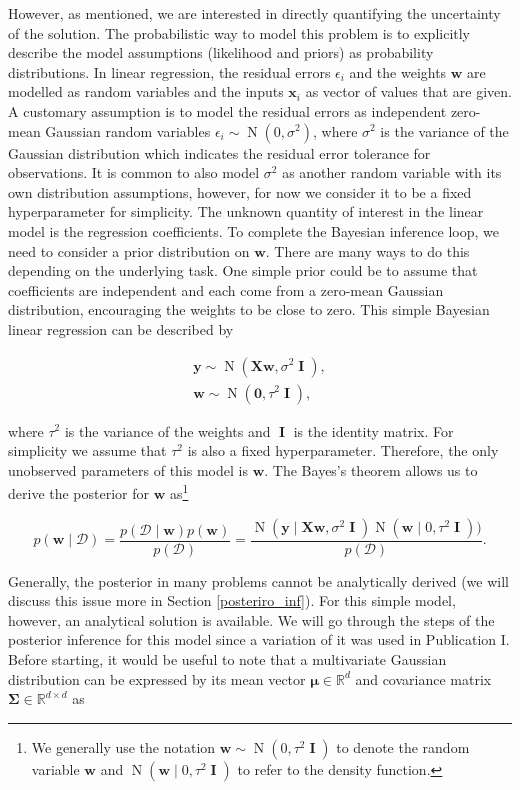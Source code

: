 \documentclass[dissertation,math,vertlayout,pdfa,colorlinks]{aaltoseries}
\newcommand{\bw}{\bm{w}}
\newcommand{\bX}{\bm{X}}
\newcommand{\by}{\bm{y}}
\newcommand{\bD}{\mathcal{D}}
\DeclareMathOperator{\eye}{\textbf{I}}
\DeclareMathOperator{\normalpdf}{N}
\begin{document}
However, as mentioned, we are interested in directly quantifying the uncertainty of the solution. The probabilistic way to model this problem is to explicitly describe the model assumptions (likelihood and priors) as probability distributions. In linear regression, the residual errors $\epsilon_i$ and the weights $\bw$ are modelled as random variables and the inputs $\bm{x}_i$ as vector of values that are given. A customary assumption is to model the residual errors as independent zero-mean Gaussian random variables $\epsilon_i \sim \normalpdf(0,\sigma^2)$, where $\sigma^2$ is the variance of the Gaussian distribution which indicates the residual error tolerance for observations. It is common to also model $\sigma^2$ as another random variable with its own distribution assumptions, however, for now we consider it to be a fixed hyperparameter for simplicity. The unknown quantity of interest in the linear model is the regression coefficients. To complete the Bayesian inference loop, we need to consider a prior distribution on $\bw$. There are many ways to do this depending on the underlying task. One simple prior could be to assume that coefficients are independent and each come from a zero-mean Gaussian distribution, encouraging the weights to be close to zero. This simple Bayesian linear regression can be described by

\begin{align}\label{Eq:simple_Bayesian_regression} 
\by \sim \normalpdf(\bX\bw,\sigma^2 \eye),\\
\bw \sim \normalpdf(\textbf{0},\tau^2 \eye), \nonumber
\end{align}

\noindent where $\tau^2$ is the variance of the weights and $\eye$ is the identity matrix. For simplicity we assume that $\tau^2$ is also a fixed hyperparameter. Therefore, the only unobserved parameters of this model is $\bw$. The Bayes's theorem allows us to derive the posterior for $\bw$ as\footnote{We generally use the notation $\bw \sim \normalpdf(0,\tau^2 \eye)$ to denote the random variable $\bw$ and $\normalpdf(\bw\mid 0,\tau^2 \eye)$ to refer to the density function.}

\begin{equation}\label{Eq:Bayes_rule_simple_reg}
p(\bw \mid \bD) = \frac{p(\bD \mid \bw)p(\bw)}{p(\bD)} = \frac{\normalpdf(\by \mid \bX \bw,\sigma^2 \eye) \normalpdf(\bw \mid 0,\tau^2 \eye))}{p(\bD)}.
\end{equation}  

Generally, the posterior in many problems cannot be analytically derived (we will discuss this issue more in Section \ref{posteriro_inf}). For this simple model, however, an analytical solution is available. We will go through the steps of the posterior inference for this model since a variation of it was used in Publication I. Before starting, it would be useful to note that a multivariate Gaussian distribution can be expressed by its mean vector $\bm{\mu}\in \mathbb{R}^d$ and covariance matrix $\bm{\Sigma}\in \mathbb{R}^{d \times d}$ as  
\end{document}
